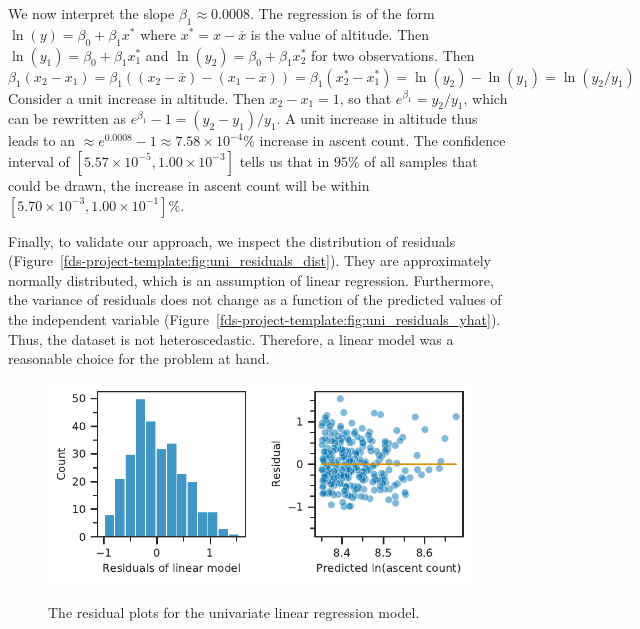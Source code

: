 \documentclass[11pt,a4paper]{article}
\begin{document}
We now interpret the slope $\beta_1\approx0.0008$. The regression is of the form $\ln(y) = \beta_0 + \beta_1x^*$ where $x^*=x-\overline{x}$ is the value of altitude. Then $\ln(y_1) = \beta_0 + \beta_1x_1^*$ and $\ln(y_2) = \beta_0 + \beta_1x_2^*$ for two observations. Then
$$\beta_1(x_2 - x_1) = \beta_1\left((x_2 - \overline{x}) - (x_1 - \overline{x})\right) = \beta_1(x_2^* - x_1^*)  = \ln(y_2) - \ln(y_1) = \ln(y_2 / y_1)$$
Consider a unit increase in altitude. Then $x_2-x_1=1$, so that $e^{\beta_1} = y_2 / y_1$, which can be rewritten as $e^{\beta_1} - 1 = (y_2 - y_1) / y_1$. A unit increase in altitude thus leads to an $\approx e^{0.0008} - 1 \approx 7.58\times10^{-4}\%$ increase in ascent count. The confidence interval of $[5.57 \times 10^{-5}, 1.00\times10^{-3}]$ tells us that in $95\%$ of all samples that could be drawn, the increase in ascent count will be within $[5.70\times10^{-3}, 1.00\times10^{-1}]\%$.

Finally, to validate our approach, we inspect the distribution of residuals (Figure~\ref{fds-project-template:fig:uni_residuals_dist}). They are approximately normally distributed, which is an assumption of linear regression. Furthermore, the variance of residuals does not change as a function of the predicted values of the independent variable (Figure~\ref{fds-project-template:fig:uni_residuals_yhat}). Thus, the dataset is not heteroscedastic. Therefore, a linear model was a reasonable choice for the problem at hand.
\begin{figure} [h!]
    \centering
    \includegraphics{report/uni_residuals.pdf}
    \begin{minipage}[t]{.5\linewidth}
        \centering
        \label{fds-project-template:fig:uni_residuals_dist}
    \end{minipage}%
    \begin{minipage}[t]{.5\linewidth}
        \centering
        \label{fds-project-template:fig:uni_residuals_yhat}
    \end{minipage}
    \caption{The residual plots for the univariate linear regression model.}
    \label{fds-project-template:fig:uni_residuals}
\end{figure}
\end{document}
